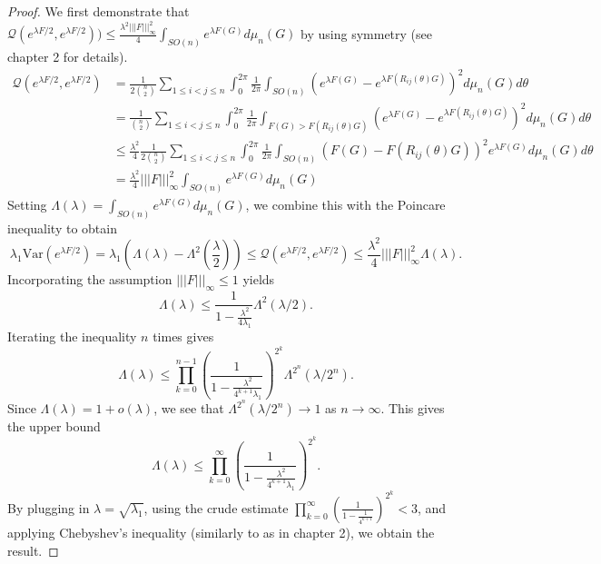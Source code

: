 \documentclass[12pt]{report}
\newcommand{\Dform}[2]{\mathcal{Q}\left(#1,#2 \right)}
\newcommand{\tripNorm}[1]{|||#1|||_\infty}
\theoremstyle{definition}
\begin{document}
\begin{proof}
	We first demonstrate that $\Dform{e^{\lambda F/2}}{e^{\lambda F/2}})\leq \frac{\lambda^2 \tripNorm{F}^2}{4} \int_{SO(n)} e^{\lambda F(G)} d\mu_n(G)$ by using symmetry (see chapter 2 for details).
	\begin{align*}
		\Dform{e^{\lambda F/2}}{e^{\lambda F/2}} &= \frac 1 {2\binom{n}{2}} \sum_{1 \leq i<j\leq n} \int_0^{2\pi} \frac{1}{2\pi} \int_{SO(n)} \left(e^{\lambda F(G)} - e^{\lambda F(R_{ij}(\theta)G)}\right)^2 d\mu_n(G) d\theta \\
		& =  \frac 1 {\binom{n}{2}} \sum_{1 \leq i<j\leq n} \int_0^{2\pi} \frac{1}{2\pi} \int_{F(G)>F(R_{ij}(\theta)G)} \left(e^{\lambda F(G)} - e^{\lambda F(R_{ij}(\theta)G)}\right)^2 d\mu_n(G) d\theta \\
		& \leq \frac{\lambda^2}{4} \frac 1 {2 \binom{n}{2}} \sum_{1 \leq i<j\leq n} \int_0^{2\pi} \frac{1}{2\pi} \int_{SO(n)} \left(F(G) - F(R_{ij}(\theta)G)\right)^2 e^{\lambda F(G)} d\mu_n(G) d\theta \\
		& = \frac{\lambda^2}{4} \tripNorm{F}^2 \int_{SO(n)} e^{\lambda F(G)} d\mu_n(G)
	\end{align*}
	Setting $\Lambda(\lambda) = \int_{SO(n)} e^{\lambda F(G)} d\mu_n(G)$, we combine this with the Poincare inequality to obtain
	\begin{equation*}
		\lambda_1 \mathrm{Var}(e^{\lambda F/2}) = \lambda_1 \left(\Lambda(\lambda)-\Lambda^2\left(\frac{\lambda}2\right)\right) \leq \Dform{e^{\lambda F/2}}{e^{\lambda F/2}} \leq \frac{\lambda^2}{4} \tripNorm{F}^2 \Lambda(\lambda).
	\end{equation*}
	Incorporating the assumption $\tripNorm{F}\leq1$ yields
	\begin{equation*}
		\Lambda(\lambda) \leq \frac{1}{1-\frac{\lambda^2}{4\lambda_1}} \Lambda^2(\lambda/2).
	\end{equation*}
	Iterating the inequality $n$ times gives
	\begin{equation*}
		\Lambda(\lambda) \leq \prod_{k=0}^{n-1} \left(\frac{1}{1-\frac{\lambda^2}{4^{k+1}\lambda_1}}\right)^{2^k} \Lambda^{2^n}(\lambda/2^n).
	\end{equation*}
	Since $\Lambda(\lambda) = 1+ o(\lambda)$, we see that $\Lambda^{2^n}(\lambda/2^n) \to 1$ as $n\to \infty$. This gives the upper bound
	\begin{equation*}
		\Lambda(\lambda)\leq \prod_{k=0}^\infty \left(\frac{1}{1-\frac{\lambda^2}{4^{k+1}\lambda_1}}\right)^{2^k}. 
	\end{equation*}
	By plugging in $\lambda=\sqrt{\lambda_1}$, using the crude estimate $\prod_{k=0}^\infty \left(\frac{1}{1-\frac{1}{4^{k+1}}}\right)^{2^k} < 3$, and applying Chebyshev's inequality (similarly to as in chapter 2), we obtain the result. 
\end{proof}
\end{document}
